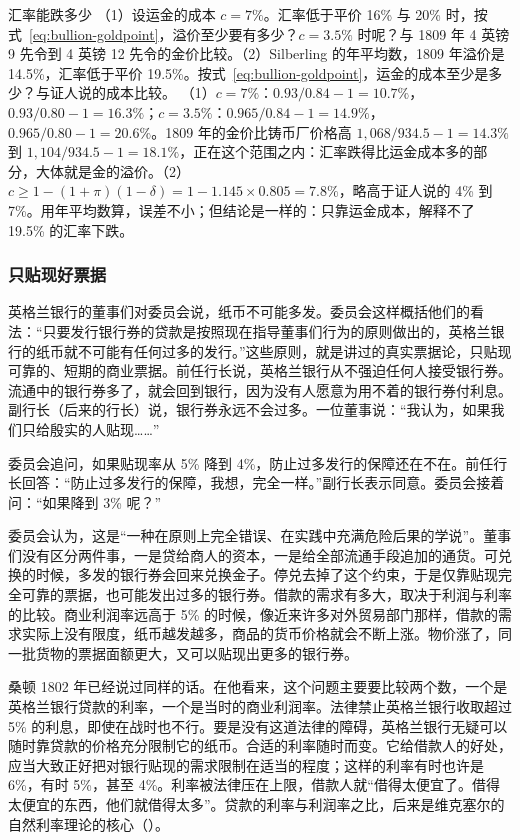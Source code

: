 \begin{example}{汇率能跌多少}\label{ex:bullion-goldpoint}
（1）设运金的成本 $c=7\%$。汇率低于平价 16\% 与 20\% 时，按式~\eqref{eq:bullion-goldpoint}，溢价至少要有多少？$c=3.5\%$ 时呢？与 1809 年 4 英镑 9 先令到 4 英镑 12 先令的金价比较。（2）Silberling 的年平均数，1809 年溢价是 14.5\%，汇率低于平价 19.5\%。按式~\eqref{eq:bullion-goldpoint}，运金的成本至少是多少？与证人说的成本比较。
\solution （1）$c=7\%$：$0.93/0.84-1=10.7\%$，$0.93/0.80-1=16.3\%$；$c=3.5\%$：$0.965/0.84-1=14.9\%$，$0.965/0.80-1=20.6\%$。1809 年的金价比铸币厂价格高 $1{,}068/934.5-1=14.3\%$ 到 $1{,}104/934.5-1=18.1\%$，正在这个范围之内：汇率跌得比运金成本多的部分，大体就是金的溢价。（2）$c\ge1-(1+\pi)(1-\delta)=1-1.145\times0.805=7.8\%$，略高于证人说的 4\% 到 7\%。用年平均数算，误差不小；但结论是一样的：只靠运金成本，解释不了 19.5\% 的汇率下跌。
\end{example}

\subsubsection{只贴现好票据}
英格兰银行的董事们对委员会说，纸币不可能多发。委员会这样概括他们的看法：“只要发行银行券的贷款是按照现在指导董事们行为的原则做出的，英格兰银行的纸币就不可能有任何过多的发行。”\cite{bullion1810}这些原则，就是讲过的真实票据论，只贴现可靠的、短期的商业票据。前任行长说，英格兰银行从不强迫任何人接受银行券。流通中的银行券多了，就会回到银行，因为没有人愿意为用不着的银行券付利息\cite{bullion1810}。副行长（后来的行长）说，银行券永远不会过多。一位董事说：“我认为，如果我们只给殷实的人贴现……”\cite{bullion1810}

委员会追问，如果贴现率从 5\% 降到 4\%，防止过多发行的保障还在不在。前任行长回答：“防止过多发行的保障，我想，完全一样。”副行长表示同意\cite{bullion1810}。委员会接着问：“如果降到 3\% 呢？”\cite{bullion1810}

委员会认为，这是“一种在原则上完全错误、在实践中充满危险后果的学说”\cite{bullion1810}。董事们没有区分两件事，一是贷给商人的资本，一是给全部流通手段追加的通货\cite{bullion1810}。可兑换的时候，多发的银行券会回来兑换金子。停兑去掉了这个约束，于是仅靠贴现完全可靠的票据，也可能发出过多的银行券\cite{bullion1810}。借款的需求有多大，取决于利润与利率的比较。商业利润率远高于 5\% 的时候，像近来许多对外贸易部门那样，借款的需求实际上没有限度，纸币越发越多，商品的货币价格就会不断上涨\cite{bullion1810}。物价涨了，同一批货物的票据面额更大，又可以贴现出更多的银行券。

桑顿 1802 年已经说过同样的话。在他看来，这个问题主要要比较两个数，一个是英格兰银行贷款的利率，一个是当时的商业利润率\cite{thornton1802}。法律禁止英格兰银行收取超过 5\% 的利息，即使在战时也不行。要是没有这道法律的障碍，英格兰银行无疑可以随时靠贷款的价格充分限制它的纸币\cite{thornton1802}。合适的利率随时而变。它给借款人的好处，应当大致正好把对银行贴现的需求限制在适当的程度；这样的利率有时也许是 6\%，有时 5\%，甚至 4\%\cite{thornton1802}。利率被法律压在上限，借款人就“借得太便宜了。借得太便宜的东西，他们就借得太多”\cite{thornton1802}。贷款的利率与利润率之比，后来是维克塞尔的自然利率理论的核心（）。


